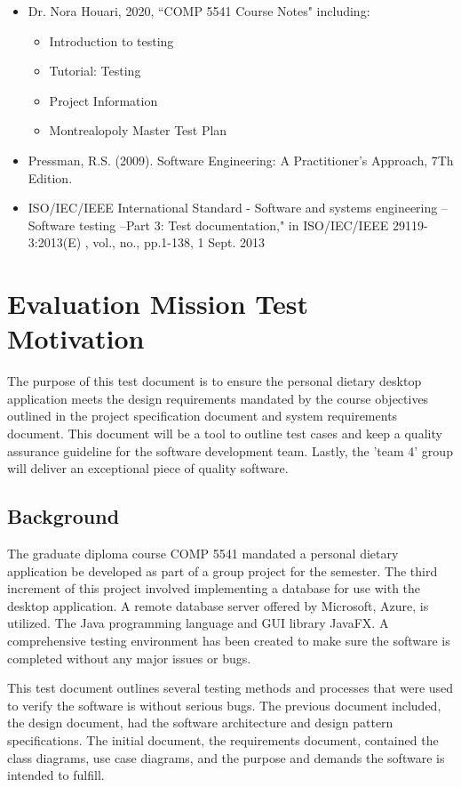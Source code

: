 \documentclass[table]{scrreprt}
\begin{document}
    \begin{itemize}

        \item Dr. Nora Houari, 2020, ``COMP 5541 Course Notes" including:
        \begin{itemize}
            \item Introduction to testing
            \item Tutorial: Testing
            \item Project Information
            \item Montrealopoly Master Test Plan
        \end{itemize}
        \item Pressman, R.S. (2009). Software Engineering: A Practitioner's Approach, 7Th Edition.

        \item ISO/IEC/IEEE International Standard - Software and systems engineering -- Software testing --Part 3: Test documentation," in ISO/IEC/IEEE 29119-3:2013(E) , vol., no., pp.1-138, 1 Sept. 2013

    \end{itemize}

    \chapter{Evaluation Mission Test Motivation}
    
    The purpose of this test document is to ensure the personal dietary desktop application meets the design requirements mandated by the course objectives outlined in the project specification document and system requirements document. This document will be a tool to outline test cases and keep a quality assurance guideline for the software development team. Lastly, the 'team 4' group will deliver an exceptional piece of quality software.

    \section{Background}
The graduate diploma course COMP 5541 mandated a personal dietary application be developed as part of a group project for the semester. The third increment of this project involved implementing a database for use with the desktop application. A remote database server offered by Microsoft, Azure, is utilized. The Java programming language and GUI library JavaFX. A comprehensive testing environment has been created to make sure the software is completed without any major issues or bugs. 
\par
This test document outlines several testing methods and processes that were used to verify the software is without serious bugs. The previous document included, the design document, had the software architecture and design pattern specifications. The initial document, the requirements document, contained the class diagrams, use case diagrams, and the purpose and demands the software is intended to fulfill.
\end{document}
